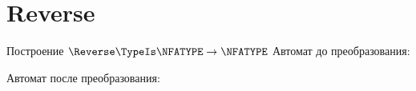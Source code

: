 \section{Reverse}
\begin{frame}{Построение $\Reverse\TypeIs\NFATYPE\to\NFATYPE$}
	Автомат до преобразования:


	Автомат после преобразования:


\end{frame}
